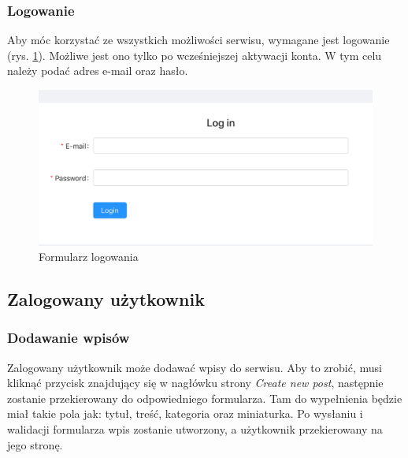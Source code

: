 \documentclass[declaration,shortabstract,polish,inz]{iithesis}
\begin{document}
\subsubsection{Logowanie}
Aby móc korzystać ze wszystkich możliwości serwisu, wymagane jest logowanie (rys. \ref{fig:login}). Możliwe jest ono tylko po wcześniejszej aktywacji konta. W tym celu należy podać adres e-mail oraz hasło.

\begin{figure}[H]
    \centering
    \includegraphics[width=\linewidth]{images/logowanie.png}
    \caption{Formularz logowania}
    \label{fig:login}
\end{figure}

\subsection{Zalogowany użytkownik}

\subsubsection{Dodawanie wpisów}
Zalogowany użytkownik może dodawać wpisy do serwisu. Aby to zrobić, musi kliknąć przycisk znajdujący się w nagłówku strony \textit{Create new post}, następnie zostanie przekierowany do odpowiedniego formularza. Tam do wypełnienia będzie miał takie pola jak: tytuł, treść, kategoria oraz miniaturka. Po wysłaniu i walidacji formularza wpis zostanie utworzony, a użytkownik przekierowany na jego stronę.
\end{document}
